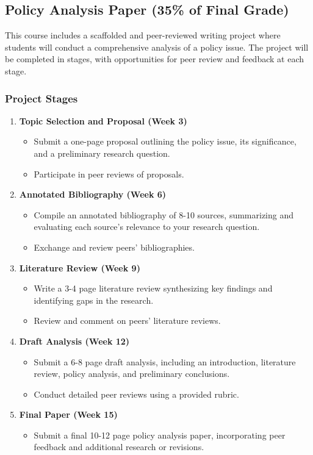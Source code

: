 \documentclass[12pt, letterpaper]{article}
\begin{document}
\subsection*{Policy Analysis Paper (35\% of Final Grade)}

This course includes a scaffolded and peer-reviewed writing project where students will conduct a comprehensive analysis of a policy issue. The project will be completed in stages, with opportunities for peer review and feedback at each stage.

\subsubsection*{Project Stages}
\begin{enumerate}
    \item \textbf{Topic Selection and Proposal (Week 3)}
    \begin{itemize}
        \item Submit a one-page proposal outlining the policy issue, its significance, and a preliminary research question.
        \item Participate in peer reviews of proposals.
    \end{itemize}
    \item \textbf{Annotated Bibliography (Week 6)}
    \begin{itemize}
        \item Compile an annotated bibliography of 8-10 sources, summarizing and evaluating each source's relevance to your research question.
        \item Exchange and review peers' bibliographies.
    \end{itemize}
    \item \textbf{Literature Review (Week 9)}
    \begin{itemize}
        \item Write a 3-4 page literature review synthesizing key findings and identifying gaps in the research.
        \item Review and comment on peers' literature reviews.
    \end{itemize}
    \item \textbf{Draft Analysis (Week 12)}
    \begin{itemize}
        \item Submit a 6-8 page draft analysis, including an introduction, literature review, policy analysis, and preliminary conclusions.
        \item Conduct detailed peer reviews using a provided rubric.
    \end{itemize}
    \item \textbf{Final Paper (Week 15)}
    \begin{itemize}
        \item Submit a final 10-12 page policy analysis paper, incorporating peer feedback and additional research or revisions.
    \end{itemize}
\end{enumerate}
\end{document}
